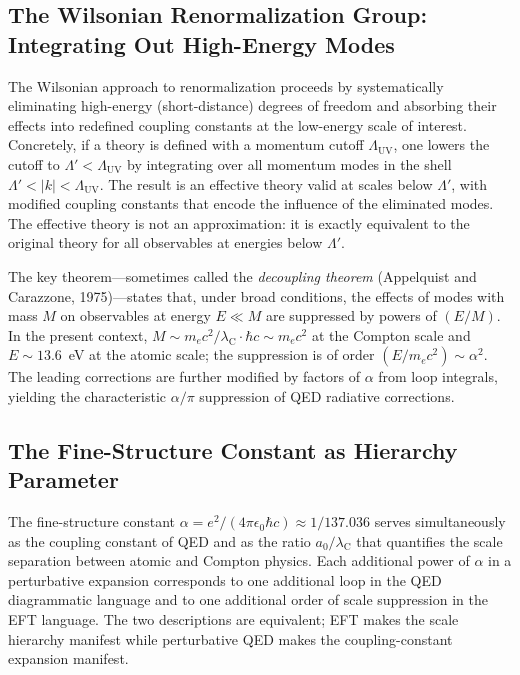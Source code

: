\documentclass[%
 reprint, amsmath,amssymb, aps, prb, ]{revtex4-2}
\numberwithin{equation}{section}
\newcommand{\lambdaC}{\lambda_{\mathrm{C}}}
\begin{document}
\subsection{The Wilsonian Renormalization Group: Integrating Out High-Energy Modes}
\label{app:eft_wilson}

The Wilsonian approach to renormalization proceeds by systematically eliminating high-energy (short-distance) degrees of freedom and absorbing their effects into redefined coupling constants at the low-energy scale of interest. Concretely, if a theory is defined with a momentum cutoff $\Lambda_{\text{UV}}$, one lowers the cutoff to $\Lambda' < \Lambda_{\text{UV}}$ by integrating over all momentum modes in the shell $\Lambda' < |k| < \Lambda_{\text{UV}}$. The result is an effective theory valid at scales below $\Lambda'$, with modified coupling constants that encode the influence of the eliminated modes. The effective theory is not an approximation: it is exactly equivalent to the original theory for all observables at energies below $\Lambda'$.

The key theorem---sometimes called the \emph{decoupling theorem} (Appelquist and Carazzone, 1975)---states that, under broad conditions, the effects of modes with mass $M$ on observables at energy $E \ll M$ are suppressed by powers of $(E/M)$. In the present context, $M \sim m_e c^2 / \lambdaC \cdot \hbar c \sim m_e c^2$ at the Compton scale and $E \sim 13.6$~eV at the atomic scale; the suppression is of order $(E/m_e c^2) \sim \alpha^2$. The leading corrections are further modified by factors of $\alpha$ from loop integrals, yielding the characteristic $\alpha/\pi$ suppression of QED radiative corrections.

\subsection{The Fine-Structure Constant as Hierarchy Parameter}
\label{app:eft_alpha}

The fine-structure constant $\alpha = e^2/(4\pi\epsilon_0 \hbar c) \approx 1/137.036$ serves simultaneously as the coupling constant of QED and as the ratio $a_0/\lambdaC$ that quantifies the scale separation between atomic and Compton physics. Each additional power of $\alpha$ in a perturbative expansion corresponds to one additional loop in the QED diagrammatic language and to one additional order of scale suppression in the EFT language. The two descriptions are equivalent; EFT makes the scale hierarchy manifest while perturbative QED makes the coupling-constant expansion manifest.
\end{document}
